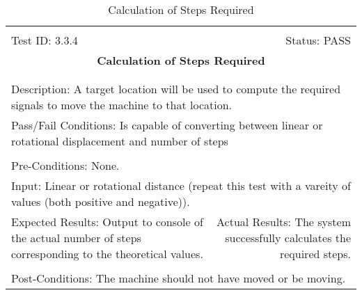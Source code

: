 \documentclass[titlepage]{article}
\begin{document}
\begin{center}
\begin{table}[h!]
\begin{tabular}{|l r|}\hline&\\[-2mm]
	Test ID: 3.3.4	&Status: PASS\\[-3mm]
	\multicolumn{2}{|c|}{\textbf{\large{Calculation of Steps Required}}}\\&\\\hline&\\[-3mm]
	\multicolumn{2}{|p{\textwidth}|}{Description: A target location will be used to compute the required signals to move the machine to that location.}\\\hline
	\multicolumn{2}{|p{\textwidth}|}{Pass/Fail Conditions: Is capable of converting between linear or rotational displacement and number of steps}\\[1mm]\hline&\\[-3mm]
	\multicolumn{2}{|p{\textwidth}|}{Pre-Conditions: None.}\\[4mm]
	\multicolumn{2}{|p{\textwidth}|}{Input: Linear or rotational distance (repeat this test with a vareity of values (both positive and negative)).}\\[2mm]\hline
	\multicolumn{1}{|p{0.49\textwidth}}{Expected Results: Output to console of the actual number of steps corresponding to the theoretical values.}	&\multicolumn{1}{|p{0.45\textwidth}|}{Actual Results: The system successfully calculates the required steps.}\\\hline&\\[-3mm]
	\multicolumn{2}{|p{\textwidth}|}{Post-Conditions: The machine should not have moved or be moving.}\\\hline
\end{tabular}
\caption{Calculation of Steps Required}
\end{table}
\end{center}
\end{document}
